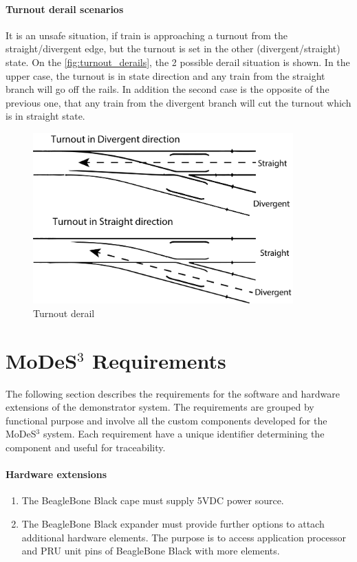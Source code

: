 \paragraph{Turnout derail scenarios}
It is an unsafe situation, if train is approaching a turnout from the straight/divergent edge, but the turnout is set in the other (divergent/straight) state. On the \autoref{fig:turnout_derails}, the 2 possible derail situation is shown. In the upper case, the turnout is in state direction and any train from the straight branch will go off the rails. In addition the second case is the opposite of the previous one, that any train from the divergent branch will cut the turnout which is in straight state.
\begin{figure}[ht]
	\centering
	\includegraphics[width=100mm, keepaspectratio]{figures/modes3/turnout_derail.png}
	\caption{Turnout derail}
	\label{fig:turnout_derails}
\end{figure}

\section{MoDeS$^3$ Requirements}\label{section:REQ}
The following section describes the requirements for the software and hardware extensions of the demonstrator system. The requirements are grouped by functional purpose and involve all the custom components developed for the MoDeS$^3$ system. Each requirement have a unique identifier determining the component and useful for traceability. 	

\paragraph{Hardware extensions}
\begin{enumerate}[label=REQ-BBB-\arabic*, leftmargin=*, format=\small]
	\item The BeagleBone Black cape must supply 5VDC power source.
	\item The BeagleBone Black expander must provide further options to attach additional hardware elements. The purpose is to access application processor and PRU unit pins of BeagleBone Black with more elements.
\end{enumerate}

